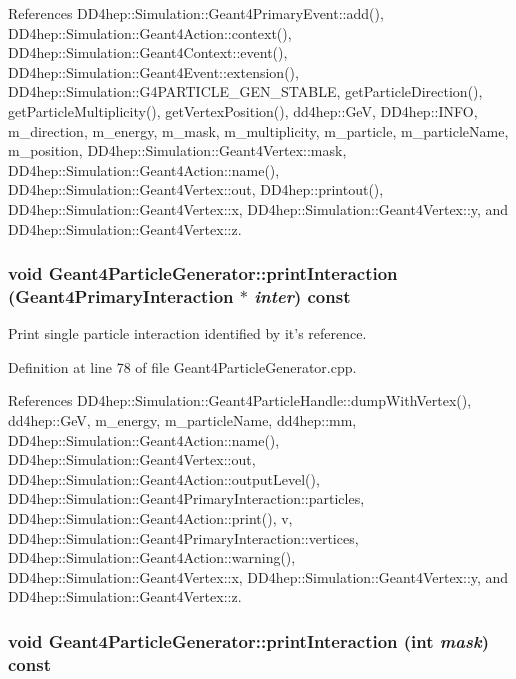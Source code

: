 References DD4hep::Simulation::Geant4PrimaryEvent::add(), DD4hep::Simulation::Geant4Action::context(), DD4hep::Simulation::Geant4Context::event(), DD4hep::Simulation::Geant4Event::extension(), DD4hep::Simulation::G4PARTICLE\_\-GEN\_\-STABLE, getParticleDirection(), getParticleMultiplicity(), getVertexPosition(), dd4hep::GeV, DD4hep::INFO, m\_\-direction, m\_\-energy, m\_\-mask, m\_\-multiplicity, m\_\-particle, m\_\-particleName, m\_\-position, DD4hep::Simulation::Geant4Vertex::mask, DD4hep::Simulation::Geant4Action::name(), DD4hep::Simulation::Geant4Vertex::out, DD4hep::printout(), DD4hep::Simulation::Geant4Vertex::x, DD4hep::Simulation::Geant4Vertex::y, and DD4hep::Simulation::Geant4Vertex::z.\hypertarget{class_d_d4hep_1_1_simulation_1_1_geant4_particle_generator_a7102042cb54dda778799821f35a3594e}{
\subsubsection[{printInteraction}]{\setlength{\rightskip}{0pt plus 5cm}void Geant4ParticleGenerator::printInteraction ({\bf Geant4PrimaryInteraction} $\ast$ {\em inter}) const}}
\label{class_d_d4hep_1_1_simulation_1_1_geant4_particle_generator_a7102042cb54dda778799821f35a3594e}


Print single particle interaction identified by it's reference. 

Definition at line 78 of file Geant4ParticleGenerator.cpp.

References DD4hep::Simulation::Geant4ParticleHandle::dumpWithVertex(), dd4hep::GeV, m\_\-energy, m\_\-particleName, dd4hep::mm, DD4hep::Simulation::Geant4Action::name(), DD4hep::Simulation::Geant4Vertex::out, DD4hep::Simulation::Geant4Action::outputLevel(), DD4hep::Simulation::Geant4PrimaryInteraction::particles, DD4hep::Simulation::Geant4Action::print(), v, DD4hep::Simulation::Geant4PrimaryInteraction::vertices, DD4hep::Simulation::Geant4Action::warning(), DD4hep::Simulation::Geant4Vertex::x, DD4hep::Simulation::Geant4Vertex::y, and DD4hep::Simulation::Geant4Vertex::z.\hypertarget{class_d_d4hep_1_1_simulation_1_1_geant4_particle_generator_abc90654fbbdfdb5ecf04726d7db97197}{
\subsubsection[{printInteraction}]{\setlength{\rightskip}{0pt plus 5cm}void Geant4ParticleGenerator::printInteraction (int {\em mask}) const}}
\label{class_d_d4hep_1_1_simulation_1_1_geant4_particle_generator_abc90654fbbdfdb5ecf04726d7db97197}


